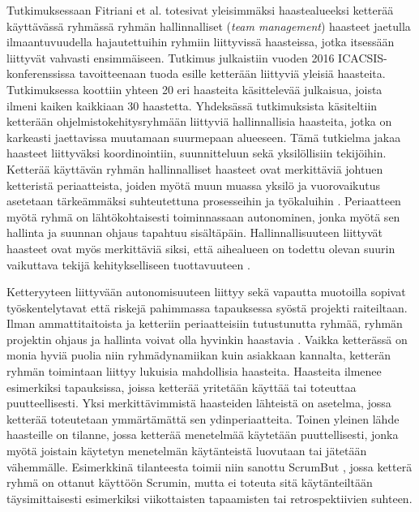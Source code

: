 Tutkimuksessaan Fitriani et al. \cite{7872736} totesivat yleisimmäksi haastealueeksi ketterää käyttävässä ryhmässä ryhmän hallinnalliset (\textit{team management}) haasteet jaetulla ilmaantuvuudella hajautettuihin ryhmiin liittyvissä haasteissa, jotka itsessään liittyvät vahvasti ensimmäiseen. Tutkimus julkaistiin vuoden 2016 ICACSIS-konferenssissa tavoitteenaan tuoda esille ketterään liittyviä yleisiä haasteita. Tutkimuksessa koottiin yhteen 20 eri haasteita käsittelevää julkaisua, joista ilmeni kaiken kaikkiaan 30 haastetta. Yhdeksässä tutkimuksista käsiteltiin ketterään ohjelmistokehitysryhmään liittyviä hallinnallisia haasteita, jotka on karkeasti jaettavissa muutamaan suurmepaan alueeseen. Tämä tutkielma jakaa haasteet liittyväksi koordinointiin, suunnitteluun sekä yksilöllisiin tekijöihin. Ketterää käyttävän ryhmän hallinnalliset haasteet ovat merkittäviä johtuen ketteristä periaatteista, joiden myötä muun muassa yksilö ja vuorovaikutus asetetaan tärkeämmäksi suhteutettuna prosesseihin ja työkaluihin \cite{beck2001agile}. Periaatteen myötä ryhmä on lähtökohtaisesti toiminnassaan autonominen, jonka myötä sen hallinta ja suunnan ohjaus tapahtuu sisältäpäin. Hallinnallisuuteen liittyvät haasteet ovat myös merkittäviä siksi, että aihealueen on todettu olevan suurin vaikuttava tekijä kehitykselliseen tuottavuuteen \cite{DEOMELO2013412}.

Ketteryyteen liittyvään autonomisuuteen liittyy sekä vapautta muotoilla sopivat työskentelytavat että riskejä pahimmassa tapauksessa syöstä projekti raiteiltaan. Ilman ammattitaitoista ja ketteriin periaatteisiin tutustunutta ryhmää, ryhmän projektin ohjaus ja hallinta voivat olla hyvinkin haastavia \cite{7872736}. Vaikka ketterässä on monia hyviä puolia niin ryhmädynamiikan kuin asiakkaan kannalta, ketterän ryhmän toimintaan liittyy lukuisia mahdollisia haasteita. Haasteita ilmenee esimerkiksi tapauksissa, joissa ketterää yritetään käyttää tai toteuttaa puutteellisesti. Yksi merkittävimmistä haasteiden lähteistä on asetelma, jossa ketterää toteutetaan ymmärtämättä sen ydinperiaatteita. Toinen yleinen lähde haasteille on tilanne, jossa ketterää menetelmää käytetään puuttellisesti, jonka myötä joistain käytetyn menetelmän käytänteistä luovutaan tai jätetään vähemmälle. Esimerkkinä tilanteesta toimii niin sanottu ScrumBut \cite{SCRUMBUT}, jossa ketterä ryhmä on ottanut käyttöön Scrumin, mutta ei toteuta sitä käytänteiltään täysimittaisesti esimerkiksi viikottaisten tapaamisten tai retrospektiivien suhteen.

